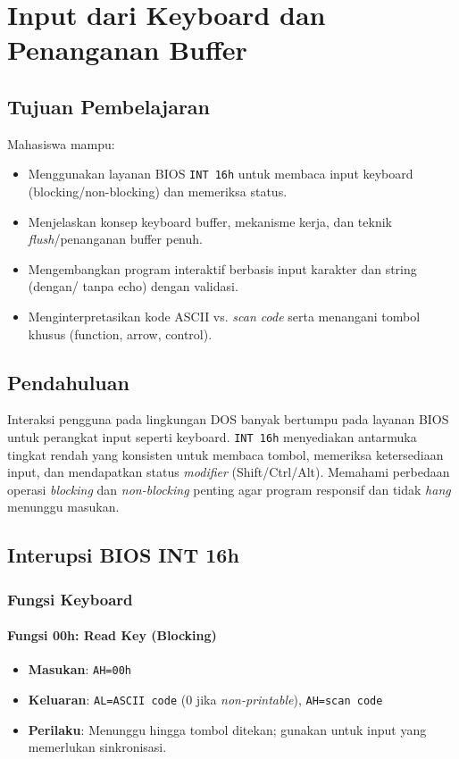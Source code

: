 \chapter{Input dari Keyboard dan Penanganan Buffer}

\section{Tujuan Pembelajaran}
Mahasiswa mampu:
\begin{itemize}
    \item Menggunakan layanan BIOS \texttt{INT 16h} untuk membaca input keyboard (blocking/non-blocking) dan memeriksa status.
    \item Menjelaskan konsep keyboard buffer, mekanisme kerja, dan teknik \textit{flush}/penanganan buffer penuh.
    \item Mengembangkan program interaktif berbasis input karakter dan string (dengan/ tanpa echo) dengan validasi.
    \item Menginterpretasikan kode ASCII vs. \textit{scan code} serta menangani tombol khusus (function, arrow, control).
\end{itemize}

\section{Pendahuluan}
Interaksi pengguna pada lingkungan DOS banyak bertumpu pada layanan BIOS untuk perangkat input seperti keyboard. \texttt{INT 16h} menyediakan antarmuka tingkat rendah yang konsisten untuk membaca tombol, memeriksa ketersediaan input, dan mendapatkan status \textit{modifier} (Shift/Ctrl/Alt). Memahami perbedaan operasi \textit{blocking} dan \textit{non-blocking} penting agar program responsif dan tidak \textit{hang} menunggu masukan.

\section{Interupsi BIOS INT 16h}
\subsection{Fungsi Keyboard}
\subsubsection{Fungsi 00h: Read Key (Blocking)}
\begin{itemize}
  \item \textbf{Masukan}: \texttt{AH=00h}
  \item \textbf{Keluaran}: \texttt{AL=ASCII code} (0 jika \textit{non-printable}), \texttt{AH=scan code}
  \item \textbf{Perilaku}: Menunggu hingga tombol ditekan; gunakan untuk input yang memerlukan sinkronisasi.
\end{itemize}

